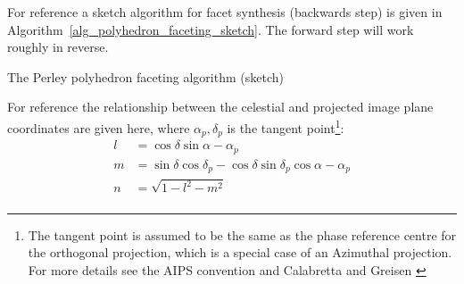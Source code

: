 For reference a sketch algorithm for facet synthesis (backwards step) is given in Algorithm~\ref{alg_polyhedron_faceting_sketch}. The forward
step will work roughly in reverse.
\begin{algorithm}
  \begin{algorithmic}
    \ENDFOR
  \ENDFOR
  \end{algorithmic}
  \caption{The Perley polyhedron faceting algorithm (sketch)}
  \label{alg_polyhedron_faceting_sketch}
\end{algorithm}

For reference the relationship between the celestial and projected image plane coordinates are given here, where
$\alpha_p,\delta_p$ is the tangent point\footnote{The tangent point is assumed to be the same as the phase reference 
centre for the orthogonal projection, which is a special case of an Azimuthal projection. For more details see the 
AIPS convention \cite{aipsnonlinearcoords} and Calabretta and Greisen \cite{calabretta2002representations}}:
\begin{equation}
 \begin{split}
  l &= \cos{\delta}\sin{\alpha-\alpha_p}\\
  m &= \sin{\delta}\cos{\delta_p}-\cos{\delta}\sin{\delta_p}\cos{\alpha-\alpha_p}\\
  n &= \sqrt{1-l^2-m^2}\\
 \end{split}
\end{equation}

